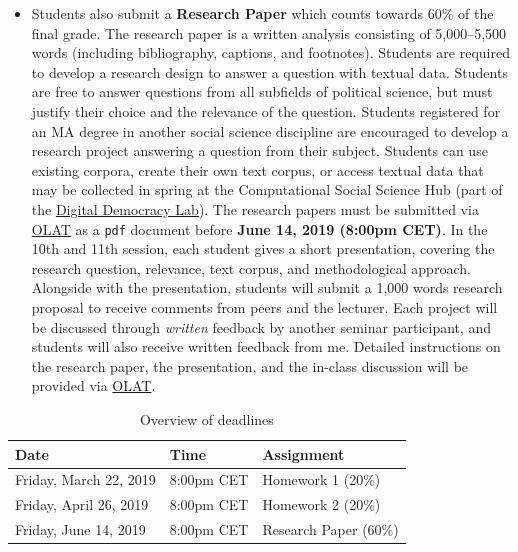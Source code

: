 \documentclass[abstract=on,parskip=full,headings=standardclasses,fontsize=11pt,paper=a4]{scrartcl}
\begin{document}
\begin{itemize}
\item Students also submit a \textbf{Research Paper} which counts towards 60\% of the final grade. The research paper is a written analysis consisting of 5,000--5,500 words (including bibliography, captions, and footnotes). Students are required to develop a research design to answer a question with textual data. Students are free to answer questions from all subfields of political science, but must justify their choice and the relevance of the question.  Students registered for an MA degree in another social science discipline are encouraged to develop a research project answering a question from their subject.   Students can use existing corpora, create their own text corpus, or access textual data that may be collected in spring at the Computational Social Science Hub (part of the \href{https://digdemlab.github.io}{Digital Democracy Lab}).  The research papers must be submitted via \href{https://lms.uzh.ch/url/RepositoryEntry/16539681118?guest=true&lang=en}{OLAT} as a \texttt{pdf} document before \textbf{June 14, 2019 (8:00pm CET)}.  In the 10th and 11th session, each student gives a  short  presentation, covering the research question, relevance, text corpus, and methodological approach. Alongside with the presentation,  students will submit a 1,000 words research proposal to receive comments from peers and the lecturer. Each project will be discussed through \textit{written} feedback by another seminar participant, and students will also receive written feedback from me. Detailed instructions on the research paper, the presentation, and the in-class discussion will be provided via \href{https://lms.uzh.ch/url/RepositoryEntry/16539681118?guest=true&lang=en}{OLAT}.
\end{itemize}



\begin{table}[h] \centering \onehalfspacing
\caption*{Overview of deadlines}
\begin{tabular}{ l l l} 
\toprule
Date &  Time & Assignment \\
\midrule
Friday, March 22, 2019 & 8:00pm CET &  Homework 1 (20\%)  \\
Friday, April 26, 2019 & 8:00pm CET  & Homework 2 (20\%) \\
Friday, June 14, 2019 & 8:00pm CET & Research Paper  (60\%) \\
\bottomrule
\end{tabular}
\end{table}
\end{document}
